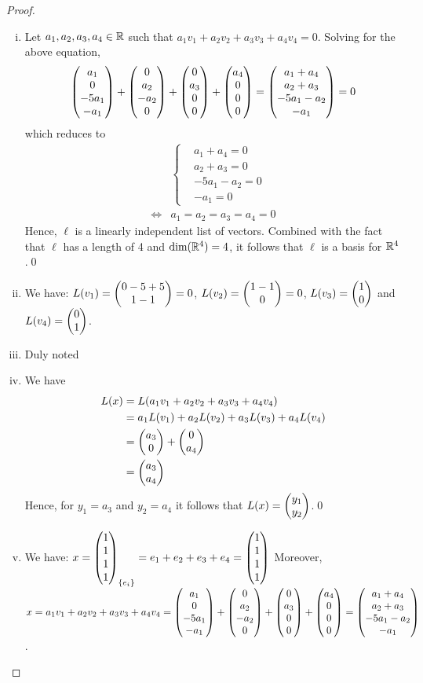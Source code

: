 \begin{proof}
    \renewcommand{\qedsymbol}{$\blacksquare$}
    \begin{enumerate}[(i)]
        \item Let $a_1,a_2,a_3,a_4\in\mathbb R$ such that $a_1v_1+a_2v_2+a_3v_3+a_4v_4=0$.
        Solving for the above equation, 
        \[
            \begin{aligned}
                \begin{pmatrix} a_1\\ 0\\-5a_1 \\ -a_1\end{pmatrix}+\begin{pmatrix} 0\\ a_2\\-a_2 \\ 0\end{pmatrix}+\begin{pmatrix} 0\\ a_3\\0 \\ 0\end{pmatrix}+\begin{pmatrix} a_4\\ 0\\0 \\ 0\end{pmatrix}=\begin{pmatrix} a_1+a_4\\ a_2+a_3\\-5a_1-a_2 \\ -a_1\end{pmatrix}=0
            \end{aligned}
        \]
        which reduces to
        \begin{align*}
            &\begin{cases}
                &a_1+a_4=0\\
                &a_2+a_3=0\\
                &-5a_1-a_2=0\\
                &-a_1=0
            \end{cases}\\\iff
            &a_1=a_2=a_3=a_4=0
        \end{align*}
        Hence, $\ell$ is a linearly independent list of vectors. 
        Combined with the fact that $\ell$ has a length of 4 and $\textnormal{dim}(\mathbb R^4)=4$, it follows that $\ell$ is a basis for $\mathbb R^4$.\qed
        \item We have: $L(v_1)=\begin{pmatrix} 0-5+5\\ 1-1\end{pmatrix}=0$, $L(v_2)=\begin{pmatrix} 1-1\\ 0\end{pmatrix}=0$, $L(v_3)=\begin{pmatrix} 1\\ 0\end{pmatrix}$ and $L(v_4)=\begin{pmatrix} 0\\ 1\end{pmatrix}$.
        \item Duly noted
        \item We have 
        \[
            \begin{aligned}
                L(x)&=L(a_1v_1+a_2v_2+a_3v_3+a_4v_4)\\
                &=a_1L(v_1)+a_2L(v_2)+a_3L(v_3)+a_4L(v_4)\\
                &=\begin{pmatrix} a_3\\ 0\end{pmatrix}+\begin{pmatrix} 0\\ a_4\end{pmatrix}\\
                &=\begin{pmatrix} a_3\\ a_4\end{pmatrix}
            \end{aligned}
        \]
        Hence, for $y_1=a_3$ and $y_2=a_4$ it follows that $L(x)=\begin{pmatrix} y_1\\ y_2\end{pmatrix}$.\qed
        \item We have: $x=\begin{pmatrix} 1\\ 1\\1 \\ 1\end{pmatrix}_{\{e_i\}}=e_1+e_2+e_3+e_4=\begin{pmatrix} 1\\ 1\\1 \\ 1\end{pmatrix}$
        Moreover, $x=a_1v_1+a_2v_2+a_3v_3+a_4v_4=\begin{pmatrix} a_1\\ 0\\-5a_1 \\ -a_1\end{pmatrix}+\begin{pmatrix} 0\\ a_2\\-a_2 \\ 0\end{pmatrix}+\begin{pmatrix} 0\\ a_3\\0 \\ 0\end{pmatrix}+\begin{pmatrix} a_4\\ 0\\0 \\ 0\end{pmatrix}=\begin{pmatrix} a_1+a_4\\ a_2+a_3\\-5a_1-a_2 \\ -a_1\end{pmatrix}$.

\end{enumerate}
\end{proof}
